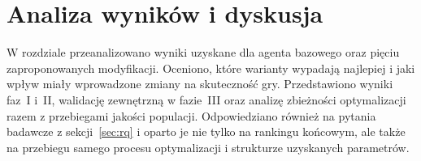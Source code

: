 \chapter{Analiza wyników i dyskusja}  \label{chap:results}

W rozdziale przeanalizowano wyniki uzyskane dla agenta bazowego oraz pięciu zaproponowanych modyfikacji. Oceniono, które warianty wypadają najlepiej i jaki wpływ miały wprowadzone zmiany na skuteczność gry. Przedstawiono wyniki faz~I i~II, walidację zewnętrzną w fazie~III oraz analizę zbieżności optymalizacji razem z przebiegami jakości populacji. Odpowiedziano również na pytania badawcze z sekcji~\ref{sec:rq} i oparto je nie tylko na rankingu końcowym, ale także na przebiegu samego procesu optymalizacji i strukturze uzyskanych parametrów.







